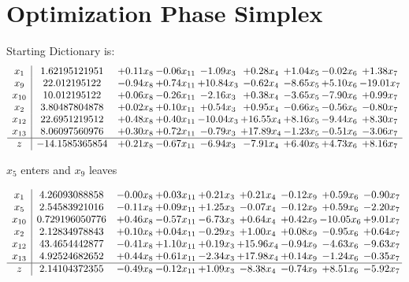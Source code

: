 \documentclass[9pt]{article}
\begin{document}
\section{Optimization Phase Simplex}
Starting Dictionary is:
\[\begin{array}{c| c c@{\hskip 2pt} c@{\hskip 2pt} c@{\hskip 2pt} c@{\hskip 2pt} c@{\hskip 2pt} c@{\hskip 2pt} c@{\hskip 2pt} }
 x_{1}   &  1.62195121951 & +  0.11 x_{8} & -0.06 x_{11} & -1.09 x_{3} & +  0.28 x_{4} & +  1.04 x_{5} & -0.02 x_{6} & +  1.38 x_{7}\\
 x_{9}   &  22.012195122 & -0.94 x_{8} & +  0.74 x_{11} & + 10.84 x_{3} & -0.62 x_{4} & -8.65 x_{5} & +  5.10 x_{6} & -19.01 x_{7}\\
 x_{10}   &  10.012195122 & +  0.06 x_{8} & -0.26 x_{11} & -2.16 x_{3} & +  0.38 x_{4} & -3.65 x_{5} & -7.90 x_{6} & +  0.99 x_{7}\\
 x_{2}   &  3.80487804878 & +  0.02 x_{8} & +  0.10 x_{11} & +  0.54 x_{3} & +  0.95 x_{4} & -0.66 x_{5} & -0.56 x_{6} & -0.80 x_{7}\\
 x_{12}   &  22.6951219512 & +  0.48 x_{8} & +  0.40 x_{11} & -10.04 x_{3} & + 16.55 x_{4} & +  8.16 x_{5} & -9.44 x_{6} & +  8.30 x_{7}\\
 x_{13}   &  8.06097560976 & +  0.30 x_{8} & +  0.72 x_{11} & -0.79 x_{3} & + 17.89 x_{4} & -1.23 x_{5} & -0.51 x_{6} & -3.06 x_{7}\\
\hline
z    &  -14.1585365854 & +  0.21 x_{8} & -0.67 x_{11} & -6.94 x_{3} & -7.91 x_{4} & +  6.40 x_{5} & +  4.73 x_{6} & +  8.16 x_{7}\\
\end{array}\]


 $ x_{5} $ enters and $ x_{9} $ leaves 

 \[\begin{array}{c| c c@{\hskip 2pt} c@{\hskip 2pt} c@{\hskip 2pt} c@{\hskip 2pt} c@{\hskip 2pt} c@{\hskip 2pt} c@{\hskip 2pt} }
 x_{1}   &  4.26093088858 & -0.00 x_{8} & +  0.03 x_{11} & +  0.21 x_{3} & +  0.21 x_{4} & -0.12 x_{9} & +  0.59 x_{6} & -0.90 x_{7}\\
 x_{5}   &  2.54583921016 & -0.11 x_{8} & +  0.09 x_{11} & +  1.25 x_{3} & -0.07 x_{4} & -0.12 x_{9} & +  0.59 x_{6} & -2.20 x_{7}\\
 x_{10}   &  0.729196050776 & +  0.46 x_{8} & -0.57 x_{11} & -6.73 x_{3} & +  0.64 x_{4} & +  0.42 x_{9} & -10.05 x_{6} & +  9.01 x_{7}\\
 x_{2}   &  2.12834978843 & +  0.10 x_{8} & +  0.04 x_{11} & -0.29 x_{3} & +  1.00 x_{4} & +  0.08 x_{9} & -0.95 x_{6} & +  0.64 x_{7}\\
 x_{12}   &  43.4654442877 & -0.41 x_{8} & +  1.10 x_{11} & +  0.19 x_{3} & + 15.96 x_{4} & -0.94 x_{9} & -4.63 x_{6} & -9.63 x_{7}\\
 x_{13}   &  4.92524682652 & +  0.44 x_{8} & +  0.61 x_{11} & -2.34 x_{3} & + 17.98 x_{4} & +  0.14 x_{9} & -1.24 x_{6} & -0.35 x_{7}\\
\hline
z    &  2.14104372355 & -0.49 x_{8} & -0.12 x_{11} & +  1.09 x_{3} & -8.38 x_{4} & -0.74 x_{9} & +  8.51 x_{6} & -5.92 x_{7}\\
\end{array}\]
\end{document}
